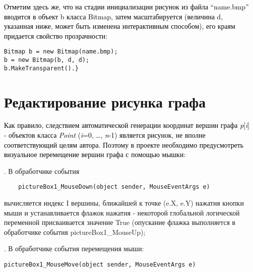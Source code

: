 \textcolor{black}{Отметим здесь же, что на стадии инициализации рисунок из файла “name.bmp” вводится в объект b класса
	Bitmap, затем масштабируется (величина d, указанная ниже, может быть изменена интерактивным способом), его краям
	придается свойство прозрачности:}

\begin{verbatim}
Bitmap b = new Bitmap(name.bmp);
b = new Bitmap(b, d, d);
b.MakeTransparent().}
\end{verbatim}


%
%

\section{Редактирование рисунка графа}\label{AKM_ch5_3}

\hypertarget{Toc503377151}{}\textcolor{black}{Как правило, следствием автоматической генерации координат вершин графа
}\textit{\textcolor{black}{p}}\textcolor{black}{[}\textit{\textcolor{black}{i}}\textcolor{black}{] - объектов класса
}\textit{\textcolor{black}{Point}}\textcolor{black}{ (}\textit{\textcolor{black}{i}}\textcolor{black}{=0, …,
}\textit{\textcolor{black}{n}}\textcolor{black}{{}-1) является рисунок, не вполне соответ}\textcolor{black}{ствующий
	целям автора. Поэтому в проекте необходимо предусмотреть визуальное перемещение вершин графа с помощью мышки: }

. В обработчике события

\begin{verbatim}
	pictureBox1_MouseDown(object sender, MouseEventArgs e)
\end{verbatim}


\noindent вычисляется индекс I вершины, ближайшей к точке (e.X, e.Y) нажатия кнопки мыши и устанавливается
	флажок нажатия - некоторой глобальной логической переменной присваивается значение
True (опускание флажка выполняется в обработчике
события pictureBox1\_MouseUp);

. В обработчике события перемещения мыши:

\begin{verbatim}
pictureBox1_MouseMove(object sender, MouseEventArgs e)
\end{verbatim}

